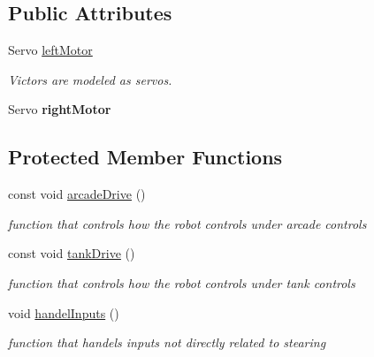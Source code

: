 \subsection*{Public Attributes}
\begin{DoxyCompactItemize}
\item 
\mbox{\label{classbasic_drive_controller_a779ddcefeff0ee48b90ed8a857c8ccdd}} 
Servo \mbox{\hyperlink{classbasic_drive_controller_a779ddcefeff0ee48b90ed8a857c8ccdd}{left\+Motor}}
\begin{DoxyCompactList}\small\item\em Victors are modeled as servos. \end{DoxyCompactList}\item 
\mbox{\label{classbasic_drive_controller_a8952ccc5b4cdcc0f8dd2f99ce33ac4fe}} 
Servo {\bfseries right\+Motor}
\end{DoxyCompactItemize}
\subsection*{Protected Member Functions}
\begin{DoxyCompactItemize}
\item 
\mbox{\label{classbasic_drive_controller_a0ede0215eb23484ba3a627b34f154999}} 
const void \mbox{\hyperlink{classbasic_drive_controller_a0ede0215eb23484ba3a627b34f154999}{arcade\+Drive}} ()
\begin{DoxyCompactList}\small\item\em function that controls how the robot controls under arcade controls \end{DoxyCompactList}\item 
\mbox{\label{classbasic_drive_controller_af53cfd610981488ee2e937f8776ffd53}} 
const void \mbox{\hyperlink{classbasic_drive_controller_af53cfd610981488ee2e937f8776ffd53}{tank\+Drive}} ()
\begin{DoxyCompactList}\small\item\em function that controls how the robot controls under tank controls \end{DoxyCompactList}\item 
\mbox{\label{classbasic_drive_controller_af55c4499434db1e56eec3c47137cbbf2}} 
void \mbox{\hyperlink{classbasic_drive_controller_af55c4499434db1e56eec3c47137cbbf2}{handel\+Inputs}} ()
\begin{DoxyCompactList}\small\item\em function that handels inputs not directly related to stearing \end{DoxyCompactList}\end{DoxyCompactItemize}
